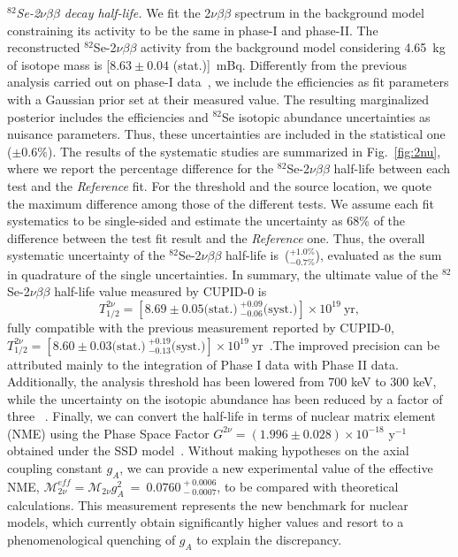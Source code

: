 \documentclass[%
reprint,
superscriptaddress,
altaffilletter,
showpacs,
showkeys,
amsmath, amssymb, aps,prl, floatfix,
]{revtex4-1}
\newcommand{\SeMass}{4.65~kg\xspace}
\newcommand{\mvveffred}{0.0760~^{+~0.0006}_{-~0.0007}}
\newcommand{\HalfLifeold}{T_{1/2}^{2\nu} = [8.60 \pm 0.03 \textrm{(stat.)}~^{+0.19}_{-0.13} \textrm{(syst.)}] \times 10^{19}~\textrm{yr}}
\newcommand{\HalfLifenewred}{T_{1/2}^{2\nu} = [8.69 \pm 0.05 \textrm{(stat.)}~^{+0.09}_{-0.06} \textrm{(syst.)}] \times 10^{19}~\textrm{yr}}
\newcommand{\vvactivitySSD}{[$8.63 \pm 0.04$ (stat.)]~mBq}
\newcommand{\se}{$^{82}$Se\xspace}
\newcommand{\vv}{2$\nu\beta\beta$\xspace}
\newcommand{\phone}{phase-I\xspace}
\newcommand{\phtwo}{phase-II\xspace}
\begin{document}
{\it \se-\vv decay half-life.} We fit the \vv spectrum in the background model constraining its activity to be the same in \phone and \phtwo. The reconstructed \se-\vv activity from the background model considering \SeMass of isotope mass is \vvactivitySSD.
Differently from the previous analysis carried out on \phone data~\cite{Azzolini:2019yib}, we include the efficiencies as fit parameters with a Gaussian prior set at their measured value. The resulting marginalized posterior includes the efficiencies and \se isotopic abundance uncertainties as nuisance parameters. Thus, these uncertainties are included in the statistical one ($\pm 0.6 \%$).
The results of the systematic studies are summarized in Fig.~\ref{fig:2nu}, where we report the percentage difference for the \se-\vv half-life between each test and the \textit{Reference} fit. 
For the threshold and the source location, we quote the maximum difference among those of the different tests.
We assume each fit systematics to be single-sided and estimate the uncertainty as 68\% of the difference between the test fit result and the {\it Reference} one. Thus, the overall systematic uncertainty of the \se-\vv half-life is~($^{+1.0\%}_{-0.7\%}$), evaluated as the sum in quadrature of the single uncertainties. In summary, the ultimate value of the \se-\vv half-life value measured by CUPID-0 is
\begin{equation*}
\HalfLifenewred, 
\end{equation*}
fully compatible with the previous measurement reported by CUPID-0, $\HalfLifeold$~\cite{Azzolini:2019yib}.The improved precision can be attributed mainly to the integration of Phase I data with Phase II data. Additionally, the analysis threshold has been lowered from 700 keV to 300 keV, while the uncertainty on the isotopic abundance has been reduced by a factor of three
~\cite{Balabanov:2023tnj}. 
Finally, we can convert the half-life in terms of nuclear matrix element (NME) using the Phase Space Factor $G^{2\nu} = (1.996 \pm 0.028)\times10^{-18}$ y$^{-1}$ obtained under the SSD model~\cite{Kotila:2012zza,JKprivate}. Without making hypotheses on the axial coupling constant $g_A$, we can provide a new experimental value of the effective NME, $\mathcal{M}^{eff}_{2\nu}=\mathcal{M}_{2\nu}g_A^2$~=~$\mvveffred$, to be compared with theoretical calculations. This measurement represents the new benchmark for nuclear models, which currently obtain significantly higher values \cite{Nomura:2022nwv,Barea:2015kwa,Popara:2021lst,Coraggio:2018tuo,Ejiri:2019ezh} and resort to a phenomenological quenching of $g_A$ to explain the discrepancy.
\end{document}
